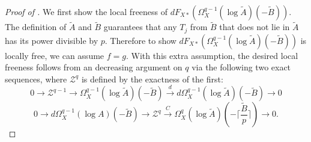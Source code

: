 \documentclass[11pt]{amsart}
\newcommand{\ra}{\rightarrow}
\newcommand{\cZ}{\mathcal{Z}}
\newcommand{\xra}{\xrightarrow}
\renewcommand{\tilde}{\widetilde}
\theoremstyle{plain}
\theoremstyle{definition}
\numberwithin{equation}{prop}
\begin{document}
\begin{proof}[Proof of ]
We first show the local freeness of $dF_{X*}(\Omega^{q-1}_X(\log \tilde A)(-\tilde B))$.
The definition of $\tilde A$ and $\tilde B$ guarantees that any $T_j$ from $\tilde B$ that does not lie in $\tilde A$ has its power divisible by $p$.
Therefore to show $dF_{X*}(\Omega^{q-1}_X(\log \tilde A)(-\tilde B))$ is locally free, we can assume $f=g$.
With this extra assumption, the desired local freeness follows from an decreasing argument on $q$ via the following two exact sequences, where $\cZ^q$ is defined by the exactness of the first:
$$0\ra \cZ^{q-1}\ra 
\Omega_X^{q-1}(\log \tilde A)(-\tilde B)\xra{d} 
d\Omega_X^{q-1}(\log \tilde A)(-\tilde B)
\ra 0 $$
$$0\ra 
d\Omega_X^{q-1}(\log A)(-\tilde B)\ra 
\cZ^q \xra{C} 
\Omega_X^{q}(\log \tilde A)(-\lceil \frac{\tilde B}{p}\rceil ) 
\ra 0.$$ 



\end{proof}
\end{document}
